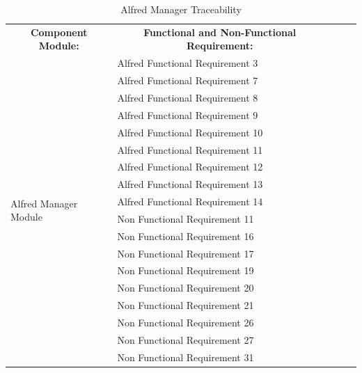 \documentclass [10pt]{article}
\begin{document}
\begin{table}[h!]
\centering
\begin{tabular}{lllll}
\cline{1-2}
\multicolumn{1}{|c|}{\textbf{Component Module:}} & \multicolumn{1}{c|}{\textbf{Functional and Non-Functional Requirement:}} &  &  &  \\ \cline{1-2}
\multicolumn{1}{|l|}{\multirow{18}{*}{Alfred Manager Module}} & \multicolumn{1}{l|}{Alfred Functional Requirement 3} &  &  &  \\ \cline{2-2}
\multicolumn{1}{|l|}{} & \multicolumn{1}{l|}{Alfred Functional Requirement 7} &  &  &  \\ \cline{2-2}
\multicolumn{1}{|l|}{} & \multicolumn{1}{l|}{Alfred Functional Requirement 8} &  &  &  \\ \cline{2-2}
\multicolumn{1}{|l|}{} & \multicolumn{1}{l|}{Alfred Functional Requirement 9} &  &  &  \\ \cline{2-2}
\multicolumn{1}{|l|}{} & \multicolumn{1}{l|}{Alfred Functional Requirement 10} &  &  &  \\ \cline{2-2}
\multicolumn{1}{|l|}{} & \multicolumn{1}{l|}{Alfred Functional Requirement 11} &  &  &  \\ \cline{2-2}
\multicolumn{1}{|l|}{} & \multicolumn{1}{l|}{Alfred Functional Requirement 12} &  &  &  \\ \cline{2-2}
\multicolumn{1}{|l|}{} & \multicolumn{1}{l|}{Alfred Functional Requirement 13} &  &  &  \\ \cline{2-2}
\multicolumn{1}{|l|}{} & \multicolumn{1}{l|}{Alfred Functional Requirement 14} &  &  &  \\ \cline{2-2}
\multicolumn{1}{|l|}{} & \multicolumn{1}{l|}{Non Functional Requirement 11} &  &  &  \\ \cline{2-2}
\multicolumn{1}{|l|}{} & \multicolumn{1}{l|}{Non Functional Requirement 16} &  &  &  \\ \cline{2-2}
\multicolumn{1}{|l|}{} & \multicolumn{1}{l|}{Non Functional Requirement 17} &  &  &  \\ \cline{2-2}
\multicolumn{1}{|l|}{} & \multicolumn{1}{l|}{Non Functional Requirement 19} &  &  &  \\ \cline{2-2}
\multicolumn{1}{|l|}{} & \multicolumn{1}{l|}{Non Functional Requirement 20} &  &  &  \\ \cline{2-2}
\multicolumn{1}{|l|}{} & \multicolumn{1}{l|}{Non Functional Requirement 21} &  &  &  \\ \cline{2-2}
\multicolumn{1}{|l|}{} & \multicolumn{1}{l|}{Non Functional Requirement 26} &  &  &  \\ \cline{2-2}
\multicolumn{1}{|l|}{} & \multicolumn{1}{l|}{Non Functional Requirement 27} &  &  &  \\ \cline{2-2}
\multicolumn{1}{|l|}{} & \multicolumn{1}{l|}{Non Functional Requirement 31} &  &  &  \\ \cline{1-2}
\end{tabular}
\caption{Alfred Manager Traceability}
\end{table}
\end{document}
